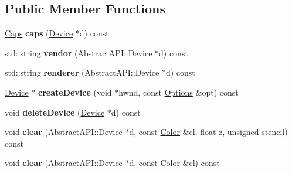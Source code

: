 \subsection*{Public Member Functions}
\begin{DoxyCompactItemize}
\item 
\hypertarget{class_tempest_1_1_direct_x9_a87c3952c033ae721e3c761fa0006a344}{\hyperlink{struct_tempest_1_1_abstract_a_p_i_1_1_caps}{Caps} {\bfseries caps} (\hyperlink{struct_direct_x9_1_1_device}{Device} $\ast$d) const }\label{class_tempest_1_1_direct_x9_a87c3952c033ae721e3c761fa0006a344}

\item 
\hypertarget{class_tempest_1_1_direct_x9_a3235c2e0ff1a33cdb169edebff4850b7}{std\+::string {\bfseries vendor} (Abstract\+A\+P\+I\+::\+Device $\ast$d) const }\label{class_tempest_1_1_direct_x9_a3235c2e0ff1a33cdb169edebff4850b7}

\item 
\hypertarget{class_tempest_1_1_direct_x9_ae1952bae2f62078ad8c4010d580b928f}{std\+::string {\bfseries renderer} (Abstract\+A\+P\+I\+::\+Device $\ast$d) const }\label{class_tempest_1_1_direct_x9_ae1952bae2f62078ad8c4010d580b928f}

\item 
\hypertarget{class_tempest_1_1_direct_x9_a3ff3562d2655ee049316aeaa9244baa2}{\hyperlink{struct_direct_x9_1_1_device}{Device} $\ast$ {\bfseries create\+Device} (void $\ast$hwnd, const \hyperlink{struct_tempest_1_1_abstract_a_p_i_1_1_options}{Options} \&opt) const }\label{class_tempest_1_1_direct_x9_a3ff3562d2655ee049316aeaa9244baa2}

\item 
\hypertarget{class_tempest_1_1_direct_x9_a629f78f9e0cedebb2d24a0446deb24bd}{void {\bfseries delete\+Device} (\hyperlink{struct_direct_x9_1_1_device}{Device} $\ast$d) const }\label{class_tempest_1_1_direct_x9_a629f78f9e0cedebb2d24a0446deb24bd}

\item 
\hypertarget{class_tempest_1_1_direct_x9_ada6c703e75fadcecda0a21d0da72075c}{void {\bfseries clear} (Abstract\+A\+P\+I\+::\+Device $\ast$d, const \hyperlink{class_tempest_1_1_color}{Color} \&cl, float z, unsigned stencil) const }\label{class_tempest_1_1_direct_x9_ada6c703e75fadcecda0a21d0da72075c}

\item 
\hypertarget{class_tempest_1_1_direct_x9_ad872bef43804a53e5bc41822cd1fc1d4}{void {\bfseries clear} (Abstract\+A\+P\+I\+::\+Device $\ast$d, const \hyperlink{class_tempest_1_1_color}{Color} \&cl) const }\label{class_tempest_1_1_direct_x9_ad872bef43804a53e5bc41822cd1fc1d4}


\end{DoxyCompactItemize}
